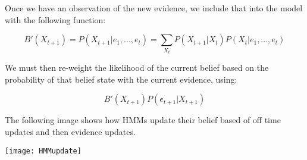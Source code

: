 Once we have an observation of the new evidence, we include that into the model with the following function:\par

\vspace{-32px}
\begin{center}
  \begin{equation}
    B'(X_{t+1})
    = P(X_{t+1} | e_{1}, ..., e_{t})
    = \sum_{X_{t}} P(X_{t+1} | X_{t}) P(X_{t} | e_{1}, ..., e_{t})
  \end{equation}
\end{center}

We must then re-weight the likelihood of the current belief based on the probability of that belief state with the current evidence, using:

\vspace{-32px}
\begin{center}
  \begin{equation}
    B'(X_{t+1}) P(e_{t+1} | X_{t+1})
  \end{equation}
\end{center}

The following image shows how HMM\textquotesingle s update their belief based of off time updates and then evidence updates.

\begin{center}
  \texttt{[image: HMMupdate]}
\end{center}
